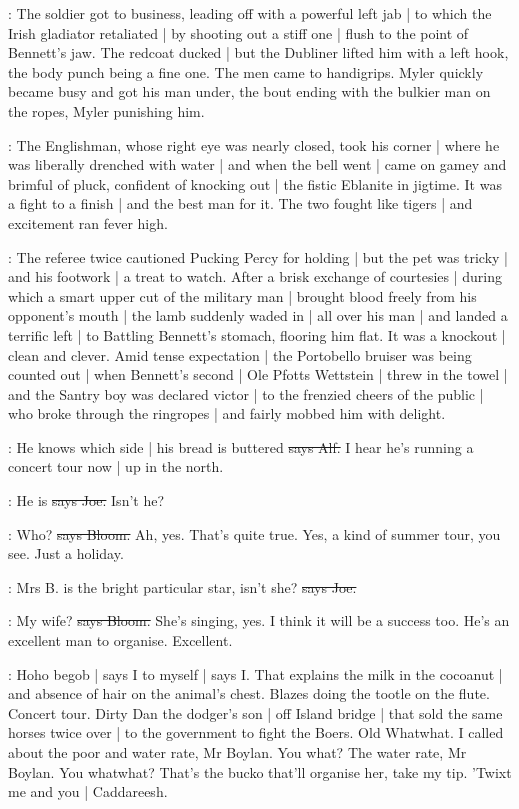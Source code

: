 :
The soldier got to business,
leading off with a powerful left jab |
to which the Irish gladiator retaliated |
by shooting out a stiff one |
flush to the point of Bennett's jaw.
The redcoat ducked |
but the Dubliner lifted him with a left hook,
the body punch being a fine one.
The men came to handigrips.
Myler quickly became busy and got his man under,
the bout ending with the bulkier man on the ropes,
Myler punishing him.

:
The Englishman,
whose right eye was nearly closed,
took his corner |
where he was liberally drenched with water |
and when the bell went |
came on gamey and brimful of pluck,
confident of knocking out |
the fistic Eblanite in jigtime.
It was a fight to a finish |
and the best man for it.
The two fought like tigers |
and excitement ran fever high.

:
The referee twice cautioned Pucking Percy for holding |
but the pet was tricky |
and his footwork |
a treat to watch.
After a brisk exchange of courtesies |
during which a smart upper cut of the military man |
brought blood freely from his opponent's mouth |
the lamb suddenly waded in |
all over his man |
and landed a terrific left |
to Battling Bennett's stomach,
flooring him flat.
It was a knockout |
clean and clever.
Amid tense expectation |
the Portobello bruiser was being counted out |
when Bennett's second |
Ole Pfotts Wettstein |
threw in the towel |
and the Santry boy was declared victor |
to the frenzied cheers of the public |
who broke through the ringropes |
and fairly mobbed him with delight.

\bergan:
He knows which side |
his bread is buttered
\sout{says Alf.}
I hear he's running a concert tour now |
up in the north.

\joe:
He is
\sout{says Joe.}
Isn't he?

\Bloom:
Who?
\sout{says Bloom.}
Ah,
yes.
That's quite true.
Yes,
a kind of summer tour,
you see.
Just a holiday.

\joe:
Mrs B. is the bright particular star,
isn't she?
\sout{says Joe.}

\Bloom:
My wife?
\sout{says Bloom.}
She's singing,
yes.
I think it will be a success too.
He's an excellent man to organise.
Excellent.

\Nq:
Hoho begob |
says I to myself |
says I.
That explains the milk in the cocoanut |
and absence of hair on the animal's chest.
Blazes doing the tootle on the flute.
Concert tour.
Dirty Dan the dodger's son |
off Island bridge |
that sold the same horses twice over |
to the government to fight the Boers.
Old Whatwhat.
I called about the poor and water rate,
Mr Boylan.
You what?
The water rate,
Mr Boylan.
You whatwhat?
That's the bucko that'll organise her,
take my tip.
'Twixt me and you |
Caddareesh.

